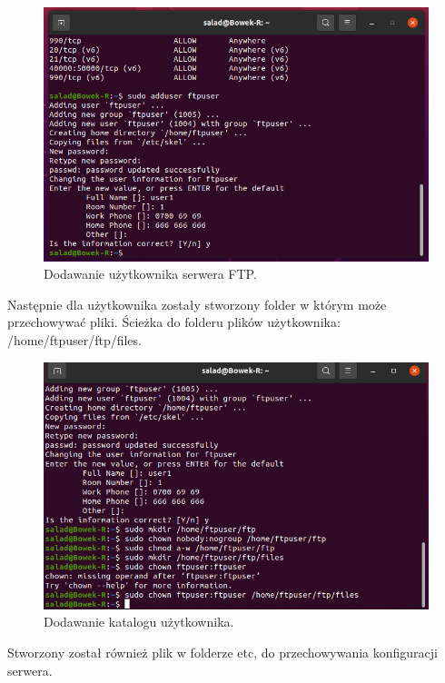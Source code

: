 \documentclass{article}
\begin{document}
\begin{figure}[H]
    \centering
    \includegraphics[scale = 0.65]{ftp/ftp_adduser.png}  
    \caption{Dodawanie użytkownika serwera FTP.}
    \label{5}
\end{figure}
\justify

Następnie dla użytkownika zostały stworzony folder w którym może przechowywać pliki. Ścieżka do folderu plików użytkownika: /home/ftpuser/ftp/files.
\newpage
\begin{figure}[H]
    \centering
    \includegraphics[scale = 0.65]{ftp/ftp_usser.png}  
    \caption{Dodawanie katalogu użytkownika.}
    \label{5}
\end{figure}
\justify
Stworzony został również plik w folderze etc, do przechowywania konfiguracji serwera.
\end{document}
